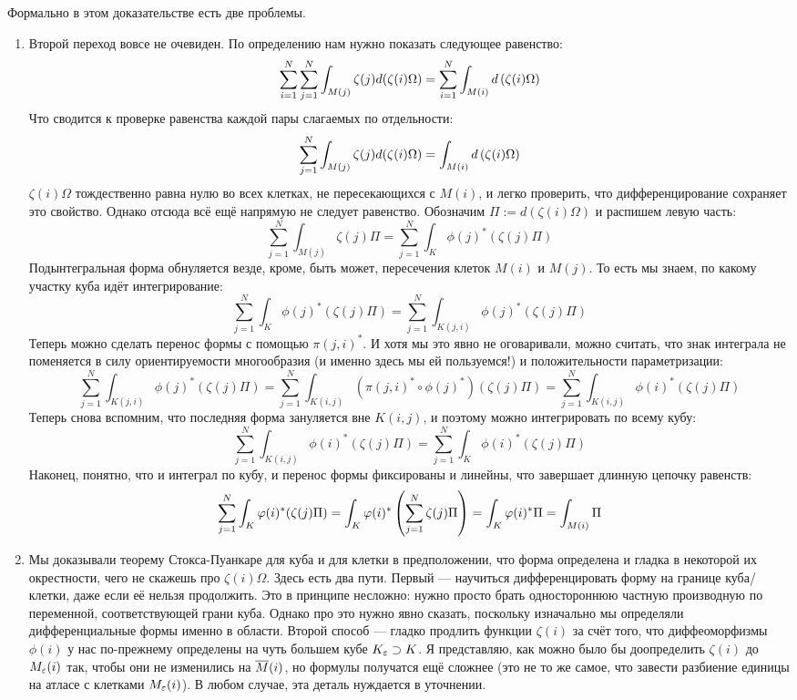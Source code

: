 \begin{anote}
	Формально в этом доказательстве есть две проблемы.
	\begin{enumerate}
		\item Второй переход вовсе не очевиден. По определению нам нужно показать следующее равенство:
		\[
			\sum_{i=1}^N \sum_{j=1}^N \int_{M(j)} \zeta(j) d(\zeta(i) \Omega) = \sum_{i=1}^N \int_{M(i)} d\left(\zeta(i) \Omega\right)
		\]
		Что сводится к проверке равенства каждой пары слагаемых по отдельности:
		\[
			\sum_{j=1}^N \int_{M(j)} \zeta(j) d(\zeta(i) \Omega) = \int_{M(i)} d\left(\zeta(i) \Omega\right)
		\]
		$\zeta(i)\Omega$ тождественно равна нулю во всех клетках, не пересекающихся с $M(i)$, и легко проверить, что дифференцирование сохраняет это свойство. Однако отсюда всё ещё напрямую не следует равенство. Обозначим $\Pi := d(\zeta(i)\Omega)$ и распишем левую часть:
		\[
			\sum_{j=1}^N \int_{M(j)} \zeta(j) \Pi = \sum_{j=1}^N \int_{K} \phi(j)^*(\zeta(j) \Pi)
		\]
		Подынтегральная форма обнуляется везде, кроме, быть может, пересечения клеток $M(i)$ и $M(j)$. То есть мы знаем, по какому участку куба идёт интегрирование:
		\[
			\sum_{j=1}^N \int_{K} \phi(j)^*(\zeta(j) \Pi) = \sum_{j=1}^N \int_{K(j,i)} \phi(j)^*(\zeta(j) \Pi)
		\]
		Теперь можно сделать перенос формы с помощью $\pi(j,i)^*$. И хотя мы это явно не оговаривали, можно считать, что знак интеграла не поменяется в силу ориентируемости многообразия (и именно здесь мы ей пользуемся!) и положительности параметризации:
		\[
			\sum_{j=1}^N \int_{K(j,i)} \phi(j)^*(\zeta(j) \Pi) = \sum_{j=1}^N \int_{K(i,j)} (\pi(j,i)^* \circ \phi(j)^*)(\zeta(j) \Pi) = \sum_{j=1}^N \int_{K(i,j)} \phi(i)^*(\zeta(j) \Pi)
		\]
		Теперь снова вспомним, что последняя форма зануляется вне $K(i,j)$, и поэтому можно интегрировать по всему кубу:
		\[
			\sum_{j=1}^N \int_{K(i,j)} \phi(i)^*(\zeta(j) \Pi) = \sum_{j=1}^N \int_{K} \phi(i)^*(\zeta(j) \Pi)
		\]
		Наконец, понятно, что и интеграл по кубу, и перенос формы фиксированы и линейны, что завершает длинную цепочку равенств:
		\[
			\sum_{j=1}^N \int_{K} \varphi(i)^*(\zeta(j) \Pi) = \int_{K} \varphi(i)^*\left(\sum_{j=1}^N \zeta(j) \Pi\right) = \int_{K} \varphi(i)^*\Pi = \int_{M(i)} \Pi
		\]
		\item
		Мы доказывали теорему Стокса-Пуанкаре для куба и для клетки в предположении, что форма определена и гладка в некоторой их окрестности, чего не скажешь про $\zeta(i)\Omega$. Здесь есть два пути. Первый --- научиться дифференцировать форму на границе куба/клетки, даже если её нельзя продолжить. Это в принципе несложно: нужно просто брать одностороннюю частную производную по переменной, соответствующей грани куба. Однако про это нужно явно сказать, поскольку изначально мы определяли дифференциальные формы именно в области. Второй способ --- гладко продлить функции $\zeta(i)$ за счёт того, что диффеоморфизмы $\phi(i)$ у нас по-прежнему определены на чуть большем кубе $K_\varepsilon \supset K$. Я представляю, как можно было бы доопределить $\zeta(i)$ до $M_\varepsilon(i)$ так, чтобы они не изменились на $\overline{M}(i)$, но формулы получатся ещё сложнее (это не то же самое, что завести разбиение единицы на атласе с клетками $M_\varepsilon(i)$). В любом случае, эта деталь нуждается в уточнении.
	\end{enumerate}
\end{anote}